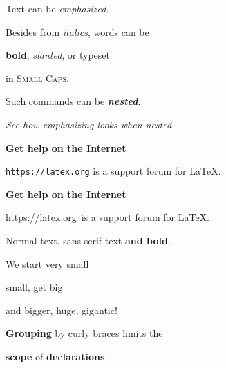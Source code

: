 \documentclass{article}
\newcommand{\keyword}[1]{\textbf{#1}}
\begin{document}
Text can be \emph{emphasized}.

Besides from \textit{italics}, words can be

\textbf{bold}, \textsl{slanted}, or typeset

in \textsc {Small Caps}.

Such commands can be \textit{\textbf{nested}}.

\emph{See how \emph{emphasizing} looks when nested.}

\textsf{\textbf{Get help on the Internet}}

\texttt{https://latex.org} is a support forum for \LaTeX.



\sffamily\bfseries Get help on the Internet

\normalfont\ttfamily https://latex.org\normalfont\ is a support forum for \LaTeX.

Normal text, {\sffamily sans serif text {\bfseries and bold}}.

\tiny We \scriptsize start \footnotesize very small

\small small, \normalsize get \large big \Large

and \LARGE bigger, \huge huge, \Huge gigantic!

\normalsize \normalfont
\keyword{Grouping} by curly braces limits the

\keyword{scope} of \keyword{declarations}.
\end{document}
